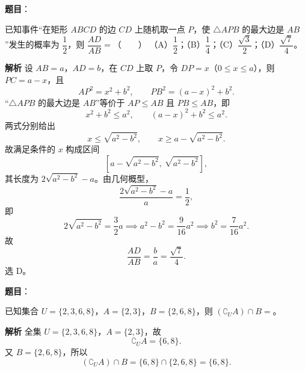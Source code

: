 \begin{answer}

\textbf{题目}：

已知事件“在矩形 $ABCD$ 的边 $CD$ 上随机取一点 $P$，使 $\triangle APB$ 的最大边是 $AB$”发生的概率为 $\dfrac12$，则 $\dfrac{AD}{AB}=$\mbox{（　　）}
（A）$\dfrac12$；（B）$\dfrac14$；（C）$\dfrac{\sqrt3}2$；（D）$\dfrac{\sqrt7}4$。

\textbf{解析}
设 $AB=a$，$AD=b$，在 $CD$ 上取 $P$，令 $DP=x$（$0\leqslant x\leqslant a$），则 $PC=a-x$，且
\nopagebreak[4]
\[AP^2=x^2+b^2,\qquad PB^2=(a-x)^2+b^2.\]
“$\triangle APB$ 的最大边是 $AB$”等价于 $AP\leqslant AB$ 且 $PB\leqslant AB$，即
\nopagebreak[4]
\[x^2+b^2\leqslant a^2,\qquad(a-x)^2+b^2\leqslant a^2.\]
两式分别给出
\nopagebreak[4]
\[x\leqslant\sqrt{a^2-b^2},\qquad x\geqslant a-\sqrt{a^2-b^2}.\]
故满足条件的 $x$ 构成区间
\nopagebreak[4]
\[\left[a-\sqrt{a^2-b^2},\ \sqrt{a^2-b^2}\right],\]
其长度为 $2\sqrt{a^2-b^2}-a$。由几何概型，
\nopagebreak[4]
\[\frac{2\sqrt{a^2-b^2}-a}{a}=\frac12,\]
即
\nopagebreak[4]
\[2\sqrt{a^2-b^2}=\frac32a\implies a^2-b^2=\frac9{16}a^2\implies b^2=\frac7{16}a^2.\]
故
\nopagebreak[4]
\[\frac{AD}{AB}=\frac ba=\frac{\sqrt7}4.\]
选 D。


\end{answer}
\begin{answer}

\textbf{题目}：

已知集合 $U=\{2,3,6,8\}$，$A=\{2,3\}$，$B=\{2,6,8\}$，则 $(\complement_U A)\cap B=$\gkblank{}。

\textbf{解析}
全集 $U=\{2,3,6,8\}$，$A=\{2,3\}$，故
\nopagebreak[4]
\[\complement_U A=\{6,8\}.\]
又 $B=\{2,6,8\}$，所以
\nopagebreak[4]
\[(\complement_U A)\cap B=\{6,8\}\cap\{2,6,8\}=\{6,8\}.\]


\end{answer}
